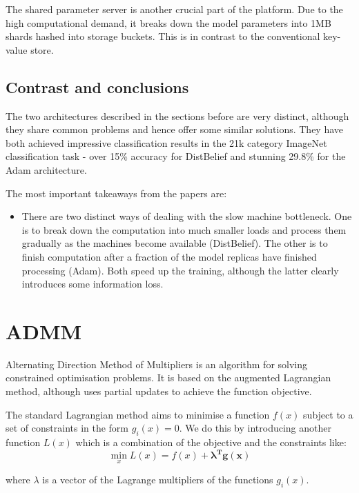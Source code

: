 \documentclass[a4paper, 12pt]{article}
\numberwithin{equation}{section}
\begin{document}
	The shared parameter server is another crucial part of the platform. Due to the high computational demand, it breaks down the model parameters into 1MB shards hashed into storage buckets. This is in contrast to the conventional key-value store.
	
	\subsection{Contrast and conclusions}
	
	The two architectures described in the sections before are very distinct, although they share common problems and hence offer some similar solutions. They have both achieved impressive classification results in the 21k category ImageNet classification task - over 15\% accuracy for DistBelief and stunning 29.8\% for the Adam architecture.
	
	The most important takeaways from the papers are:
	\begin{itemize}
		\item There are two distinct ways of dealing with the slow machine bottleneck. One is to break down the computation into much smaller loads and process them gradually as the machines become available (DistBelief). The other is to finish computation after a fraction of the model replicas have finished processing (Adam). Both speed up the training, although the latter clearly introduces some information loss.
	\end{itemize}
	
	\section{ADMM}
	\label{ADMM}
	
	Alternating Direction Method of Multipliers is an algorithm for solving constrained optimisation problems. It is based on the augmented Lagrangian method, although uses partial updates to achieve the function objective.
	
	The standard Lagrangian method aims to minimise a function $f(x)$ subject to a set of constraints in the form $g_i(x)=0$. We do this by introducing another function $L(x)$ which is a combination of the objective and the constraints like:
	\begin{equation}
	\min_{x} L(x) = f(x) + \boldsymbol{\lambda^T g(x)}
	\end{equation}
	
	where $\lambda$ is a vector of the Lagrange multipliers of the functions $g_i(x)$.\\
	
\end{document}
